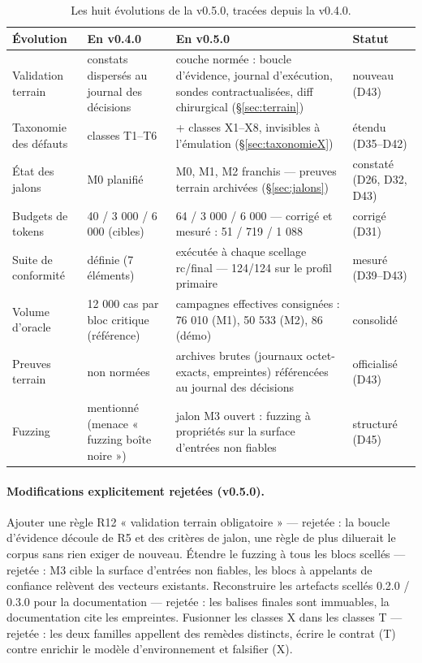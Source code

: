 \begin{table}[htbp]
\centering\small
\caption{Les huit évolutions de la v0.5.0, tracées depuis la v0.4.0.}
\label{tab:correspondance050}
\begin{tabularx}{\textwidth}{@{}l Y Y l@{}}
\toprule
\textbf{Évolution} & \textbf{En v0.4.0} & \textbf{En v0.5.0} & \textbf{Statut} \\
\midrule
Validation terrain & constats dispersés au journal des décisions & couche normée :
boucle d'évidence, journal d'exécution, sondes contractualisées, diff chirurgical
(§\ref{sec:terrain}) & nouveau (D43) \\
Taxonomie des défauts & classes T1--T6 & + classes X1--X8, invisibles à l'émulation
(§\ref{sec:taxonomieX}) & étendu (D35--D42) \\
État des jalons & M0 planifié & M0, M1, M2 franchis — preuves terrain archivées
(§\ref{sec:jalons}) & constaté (D26, D32, D43) \\
Budgets de tokens & 40 / 3 000 / 6 000 (cibles) & 64 / 3 000 / 6 000 — corrigé et mesuré :
51 / 719 / 1 088 & corrigé (D31) \\
Suite de conformité & définie (7 éléments) & exécutée à chaque scellage rc/final — 124/124
sur le profil primaire & mesuré (D39--D43) \\
Volume d'oracle & 12 000 cas par bloc critique (référence) & campagnes effectives
consignées : 76 010 (M1), 50 533 (M2), 86 (démo) & consolidé \\
Preuves terrain & non normées & archives brutes (journaux octet-exacts, empreintes)
référencées au journal des décisions & officialisé (D43) \\
Fuzzing & mentionné (menace « fuzzing boîte noire ») & jalon M3 ouvert : fuzzing à
propriétés sur la surface d'entrées non fiables & structuré (D45) \\
\bottomrule
\end{tabularx}
\end{table}

\paragraph{Modifications explicitement rejetées (v0.5.0).} Ajouter une règle R12
« validation terrain obligatoire » — rejetée : la boucle d'évidence découle de R5 et des
critères de jalon, une règle de plus diluerait le corpus sans rien exiger de nouveau.
Étendre le fuzzing à tous les blocs scellés — rejetée : M3 cible la surface d'entrées non
fiables, les blocs à appelants de confiance relèvent des vecteurs existants. Reconstruire
les artefacts scellés 0.2.0 / 0.3.0 pour la documentation — rejetée : les balises finales
sont immuables, la documentation cite les empreintes. Fusionner les classes X dans les
classes T — rejetée : les deux familles appellent des remèdes distincts, écrire le contrat
(T) contre enrichir le modèle d'environnement et falsifier (X).

